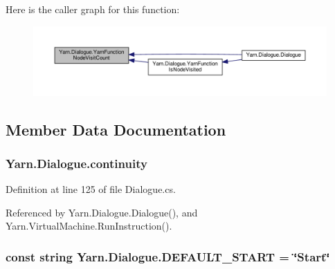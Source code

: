 Here is the caller graph for this function\-:
\nopagebreak
\begin{figure}[H]
\begin{center}
\leavevmode
\includegraphics[width=350pt]{a00086_a10c9f22d3f55e74f091cd6069c431094_icgraph}
\end{center}
\end{figure}




\subsection{Member Data Documentation}
\hypertarget{a00086_ae94eaa4b03b432422f5d205fabe37ff5}{
\subsubsection[{continuity}]{ Yarn.\-Dialogue.\-continuity\hspace{0.3cm}{\ttfamily [package]}}}\label{a00086_ae94eaa4b03b432422f5d205fabe37ff5}


Definition at line 125 of file Dialogue.\-cs.



Referenced by Yarn.\-Dialogue.\-Dialogue(), and Yarn.\-Virtual\-Machine.\-Run\-Instruction().

\hypertarget{a00086_a1b643f15f734090e6a58cbf13dafd28f}{
\subsubsection[{D\-E\-F\-A\-U\-L\-T\-\_\-\-S\-T\-A\-R\-T}]{\setlength{\rightskip}{0pt plus 5cm}const string Yarn.\-Dialogue.\-D\-E\-F\-A\-U\-L\-T\-\_\-\-S\-T\-A\-R\-T = \char`\"{}Start\char`\"{}}}\label{a00086_a1b643f15f734090e6a58cbf13dafd28f}


